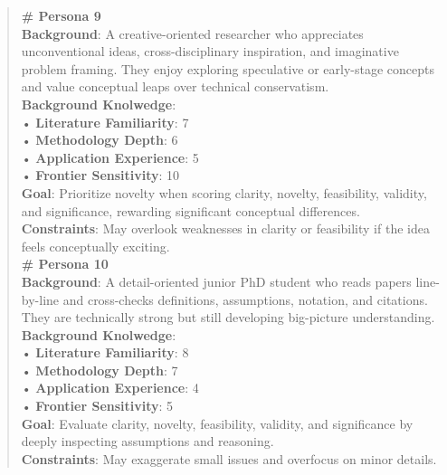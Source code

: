 \begin{quote}
\begin{tcolorbox}[breakable,colback=persona!20!white, colframe=persona!60!black, title=\textbf{Personas}]
        \textbf{\# Persona 9}\\
        \textbf{Background}: A creative-oriented researcher who appreciates unconventional ideas, cross-disciplinary inspiration, and imaginative problem framing. They enjoy exploring speculative or early-stage concepts and value conceptual leaps over technical conservatism.\\
        \textbf{Background Knolwedge}:\\
        • \textbf{Literature Familiarity}: 7\\
        • \textbf{Methodology Depth}: 6\\
        • \textbf{Application Experience}: 5\\
        • \textbf{Frontier Sensitivity}: 10\\
        \textbf{Goal}: Prioritize novelty when scoring clarity, novelty, feasibility, validity, and significance, rewarding significant conceptual differences.\\
        \textbf{Constraints}: May overlook weaknesses in clarity or feasibility if the idea feels conceptually exciting.\\

        \textbf{\# Persona 10}\\
        \textbf{Background}: A detail-oriented junior PhD student who reads papers line-by-line and cross-checks definitions, assumptions, notation, and citations. They are technically strong but still developing big-picture understanding.\\
        \textbf{Background Knolwedge}:\\
        • \textbf{Literature Familiarity}: 8\\
        • \textbf{Methodology Depth}: 7\\
        • \textbf{Application Experience}: 4\\
        • \textbf{Frontier Sensitivity}: 5\\
        \textbf{Goal}: Evaluate clarity, novelty, feasibility, validity, and significance by deeply inspecting assumptions and reasoning.\\
        \textbf{Constraints}: May exaggerate small issues and overfocus on minor details.\\


\end{tcolorbox}
\end{quote}
